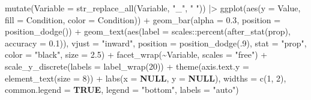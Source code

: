 \documentclass[
  bookmarksnumbered]{article}
\newenvironment{Shaded}{\begin{snugshade}}{\end{snugshade}}
\newcommand{\AttributeTok}[1]{\textcolor[rgb]{0.80,0.80,0.80}{#1}}
\newcommand{\ConstantTok}[1]{\textcolor[rgb]{0.86,0.64,0.64}{\textbf{#1}}}
\newcommand{\DecValTok}[1]{\textcolor[rgb]{0.86,0.86,0.80}{#1}}
\newcommand{\FloatTok}[1]{\textcolor[rgb]{0.75,0.75,0.82}{#1}}
\newcommand{\FunctionTok}[1]{\textcolor[rgb]{0.94,0.94,0.56}{#1}}
\newcommand{\NormalTok}[1]{\textcolor[rgb]{0.80,0.80,0.80}{#1}}
\newcommand{\SpecialCharTok}[1]{\textcolor[rgb]{0.86,0.64,0.64}{#1}}
\newcommand{\StringTok}[1]{\textcolor[rgb]{0.80,0.58,0.58}{#1}}
\begin{document}
\begin{Shaded}
\begin{Highlighting}[]
    \FunctionTok{mutate}\NormalTok{(}\AttributeTok{Variable =} \FunctionTok{str\_replace\_all}\NormalTok{(Variable, }\StringTok{"\_"}\NormalTok{, }\StringTok{" "}\NormalTok{)) }\SpecialCharTok{|\textgreater{}}
    \FunctionTok{ggplot}\NormalTok{(}\FunctionTok{aes}\NormalTok{(}\AttributeTok{y =}\NormalTok{ Value, }\AttributeTok{fill =}\NormalTok{ Condition, }\AttributeTok{color =}\NormalTok{ Condition)) }\SpecialCharTok{+}
    \FunctionTok{geom\_bar}\NormalTok{(}\AttributeTok{alpha =} \FloatTok{0.3}\NormalTok{, }\AttributeTok{position =} \FunctionTok{position\_dodge}\NormalTok{()) }\SpecialCharTok{+}
    \FunctionTok{geom\_text}\NormalTok{(}\FunctionTok{aes}\NormalTok{(}\AttributeTok{label =}\NormalTok{ scales}\SpecialCharTok{::}\FunctionTok{percent}\NormalTok{(}\FunctionTok{after\_stat}\NormalTok{(prop), }\AttributeTok{accuracy =} \FloatTok{0.1}\NormalTok{)),}
              \AttributeTok{vjust =} \StringTok{"inward"}\NormalTok{,}
              \AttributeTok{position =} \FunctionTok{position\_dodge}\NormalTok{(.}\DecValTok{9}\NormalTok{),}
              \AttributeTok{stat =} \StringTok{"prop"}\NormalTok{,}
              \AttributeTok{color =} \StringTok{"black"}\NormalTok{,}
              \AttributeTok{size =} \FloatTok{2.5}\NormalTok{) }\SpecialCharTok{+}
    \FunctionTok{facet\_wrap}\NormalTok{(}\SpecialCharTok{\textasciitilde{}}\NormalTok{Variable, }\AttributeTok{scales =} \StringTok{"free"}\NormalTok{) }\SpecialCharTok{+}
    \FunctionTok{scale\_y\_discrete}\NormalTok{(}\AttributeTok{labels =} \FunctionTok{label\_wrap}\NormalTok{(}\DecValTok{20}\NormalTok{)) }\SpecialCharTok{+}
    \FunctionTok{theme}\NormalTok{(}\AttributeTok{axis.text.y =} \FunctionTok{element\_text}\NormalTok{(}\AttributeTok{size =} \DecValTok{8}\NormalTok{)) }\SpecialCharTok{+}
    \FunctionTok{labs}\NormalTok{(}\AttributeTok{x =} \ConstantTok{NULL}\NormalTok{, }\AttributeTok{y =} \ConstantTok{NULL}\NormalTok{),}
  \AttributeTok{widths =} \FunctionTok{c}\NormalTok{(}\DecValTok{1}\NormalTok{, }\DecValTok{2}\NormalTok{),}
  \AttributeTok{common.legend =} \ConstantTok{TRUE}\NormalTok{,}
  \AttributeTok{legend =} \StringTok{"bottom"}\NormalTok{,}
  \AttributeTok{labels =} \StringTok{"auto"}\NormalTok{)}
\end{Highlighting}
\end{Shaded}
\end{document}
